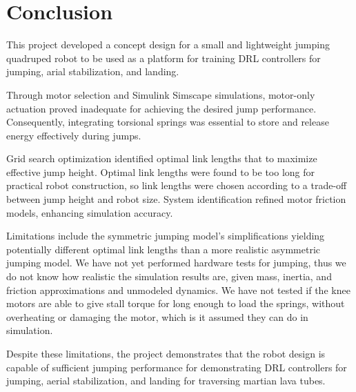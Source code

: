 \section{Conclusion}
\label{sec:conclusion}

This project developed a concept design for a small and lightweight jumping quadruped robot to be used as a platform for training DRL controllers for jumping, arial stabilization, and landing. 

Through motor selection and Simulink Simscape simulations, motor-only actuation proved inadequate for achieving the desired jump performance. Consequently, integrating torsional springs was essential to store and release energy effectively during jumps.

Grid search optimization identified optimal link lengths that to maximize effective jump height. Optimal link lengths were found to be too long for practical robot construction, so link lengths were chosen according to a trade-off between jump height and robot size. System identification refined motor friction models, enhancing simulation accuracy.

Limitations include the symmetric jumping model's simplifications yielding potentially different optimal link lengths than a more realistic asymmetric jumping model. We have not yet performed hardware tests for jumping, thus we do not know how realistic the simulation results are, given mass, inertia, and friction approximations and unmodeled dynamics. We have not tested if the knee motors are able to give stall torque for long enough to load the springs, without overheating or damaging the motor, which is it assumed they can do in simulation.

Despite these limitations, the project demonstrates that the robot design is capable of sufficient jumping performance for demonstrating DRL controllers for jumping, aerial stabilization, and landing for traversing martian lava tubes.
